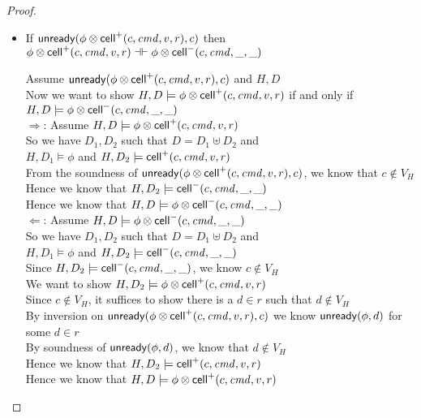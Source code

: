 \begin{proof}
\begin{itemize}
\item If $\mathsf{unready}({\phi \otimes \mathsf{cell}^{+}({c}, {\mathit{cmd}}, {v}, {r})}, {c})$ then $\phi \otimes \mathsf{cell}^{+}({c}, {\mathit{cmd}}, {v}, {r}) \dashv\vdash \phi \otimes \mathsf{cell}^{-}({c}, {\mathit{cmd}}, {\_}, {\_})$
\begin{tabbedproof}
\oo Assume $\mathsf{unready}({\phi \otimes \mathsf{cell}^{+}({c}, {\mathit{cmd}}, {v}, {r})}, {c})$  and $H, D$ \\
\oo Now we want to show $H, D \models \phi \otimes \mathsf{cell}^{+}({c}, {\mathit{cmd}}, {v}, {r})$ if and only if \\
\ox $H, D \models \phi \otimes \mathsf{cell}^{-}({c}, {\mathit{cmd}}, {\_}, {\_})$ \\
\oo $\Rightarrow$: Assume $H, D \models \phi \otimes \mathsf{cell}^{+}({c}, {\mathit{cmd}}, {v}, {r})$ \\
\ooo So we have $D_1, D_2$ such that $D = D_1 \uplus D_2$ and \\
\oox $H, D_1 \models \phi$ and $H, D_2 \models \mathsf{cell}^{+}({c}, {\mathit{cmd}}, {v}, {r})$ \\
\ooo From the soundness of $\mathsf{unready}({\phi \otimes \mathsf{cell}^{+}({c}, {\mathit{cmd}}, {v}, {r})}, {c})$, we know that $c \not \in V_H$ \\
\ooo Hence we know that $H, D_2 \models \mathsf{cell}^{-}({c}, {\mathit{cmd}}, {\_}, {\_})$ \\
\ooo Hence we know that $H, D \models \phi \otimes \mathsf{cell}^{-}({c}, {\mathit{cmd}}, {\_}, {\_})$ \\
\oo $\Leftarrow$: Assume $H, D \models \phi \otimes \mathsf{cell}^{-}({c}, {\mathit{cmd}}, {\_}, {\_})$ \\
\ooo So we have $D_1, D_2$ such that $D = D_1 \uplus D_2$ and \\
\oox $H, D_1 \models \phi$ and $H, D_2 \models \mathsf{cell}^{-}({c}, {\mathit{cmd}}, {\_}, {\_})$ \\
\ooo Since $H, D_2 \models \mathsf{cell}^{-}({c}, {\mathit{cmd}}, {\_}, {\_})$, we know $c \not\in V_H$ \\ 
\ooo We want to show $H, D_2 \models \phi \otimes \mathsf{cell}^{+}({c}, {\mathit{cmd}}, {v}, {r})$ \\
\ooo Since $c \not\in V_H$, it suffices to show there is a $d \in r$ such that $d \not\in V_H$ \\
\ooo By inversion on $\mathsf{unready}({\phi \otimes \mathsf{cell}^{+}({c}, {\mathit{cmd}}, {v}, {r})}, {c})$ we know $\mathsf{unready}({\phi}, {d})$ for some $d \in r$ \\
\ooo By soundness of $\mathsf{unready}({\phi}, {d})$, we know that $d \not\in V_H$ \\
\ooo Hence we know that $H, D_2 \models \mathsf{cell}^{+}({c}, {\mathit{cmd}}, {v}, {r})$ \\
\ooo Hence we know that $H, D \models \phi \otimes \mathsf{cell}^{+}({c}, {\mathit{cmd}}, {v}, {r})$ \\
\end{tabbedproof}
\end{itemize}
\end{proof}



